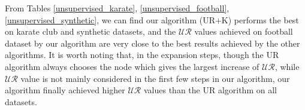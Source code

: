 \documentclass[\main/thesis.tex]{subfiles}
\begin{document}


From Tables \ref{unsupervised_karate}, \ref{unsupervised_football}, \ref{unsupervised_synthetic}, we can find our algorithm (UR+K) performs the best on karate club and synthetic datasets, and the $\mathcal{UR}$ values achieved on football dataset by our algorithm are very close to the best results achieved by the  other algorithms. It is worth noting that, in the expansion steps, though the UR algorithm always chooses the node which gives the largest increase of $\mathcal{UR}$, while $\mathcal{UR}$ value is not mainly considered in the first few steps in our algorithm, our algorithm finally achieved higher $\mathcal{UR}$ values than the UR algorithm on all datasets.
\end{document}
